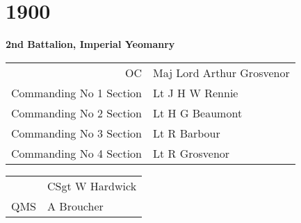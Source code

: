 \chapter*{1900}

\begin{center}
  \Large
  \textbf{2nd Battalion, Imperial Yeomanry}
\end{center}

\begin{center}
  \begin{tabular}{rl}
    OC & Maj Lord Arthur Grosvenor \\
    Commanding No 1 Section & Lt J H W Rennie \\
    Commanding No 2 Section & Lt H G Beaumont \\
    Commanding No 3 Section & Lt R Barbour \\
    Commanding No 4 Section & Lt R Grosvenor \\
  \end{tabular}
\end{center}

\begin{center}
  \begin{tabular}{rl}
    & CSgt W Hardwick \\
    QMS & A Broucher \\
  \end{tabular}
\end{center}

